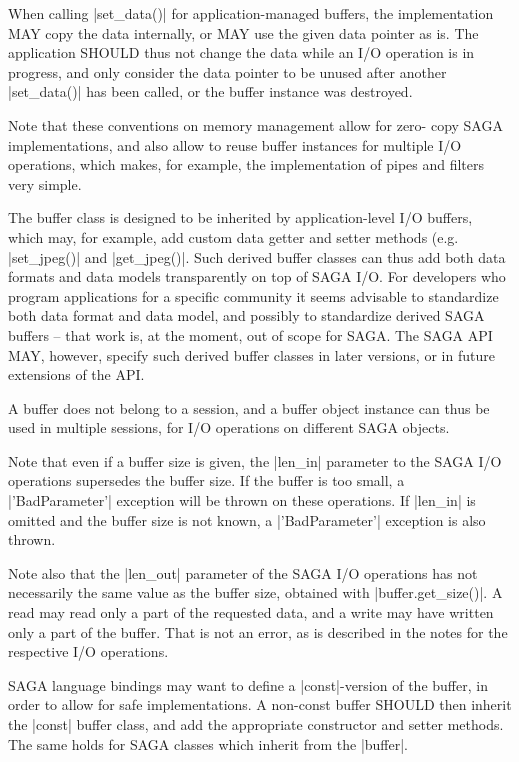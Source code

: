  When calling |set_data()| for application-managed buffers, the
 implementation MAY copy the data internally, or MAY use the
 given data pointer as is.  The application SHOULD thus not
 change the data while an I/O operation is in progress, and only
 consider the data pointer to be unused after another
 |set_data()| has been called, or the buffer instance was
 destroyed.
 
 Note that these conventions on memory management allow for zero- copy
 SAGA implementations, and also allow to reuse buffer
 instances for multiple I/O operations, which makes, for
 example, the implementation of pipes and filters very simple.
 
 The buffer class is designed to be inherited by application-level
 I/O buffers, which may, for example, add custom data
 getter and setter methods (e.g. |set_jpeg()| and |get_jpeg()|.
 Such derived buffer classes can thus add both data formats and
 data models transparently on top of SAGA I/O.  For developers
 who program applications for a specific community it seems
 advisable to standardize both data format and data model, and
 possibly to standardize derived SAGA buffers -- that work is,
 at the moment, out of scope for SAGA.  The SAGA API MAY,
 however, specify such derived buffer classes in later versions,
 or in future extensions of the API.  
 
 A buffer does not belong to a session, and a buffer object
 instance can thus be used in multiple sessions, for I/O
 operations on different SAGA objects.
 
 Note that even if a buffer size is given, the |len_in|
 parameter to the SAGA I/O operations supersedes the buffer
 size.  If the buffer is too small, a |'BadParameter'| exception
 will be thrown on these operations.  If |len_in| is omitted
 and the buffer size is not known, a |'BadParameter'| exception
 is also thrown.
 
 Note also that the |len_out| parameter of the SAGA I/O
 operations has not necessarily the same value as the buffer
 size, obtained with |buffer.get_size()|.  A read may read only
 a part of the requested data, and a write may have written only
 a part of the buffer.  That is not an error, as is described in
 the notes for the respective I/O operations.
 
 SAGA language bindings may want to define a |const|-version of
 the buffer, in order to allow for safe implementations.
 A non-const buffer SHOULD then inherit the |const| buffer class,
 and add the appropriate constructor and setter methods.
 The same holds for SAGA classes which inherit from the |buffer|.
 
